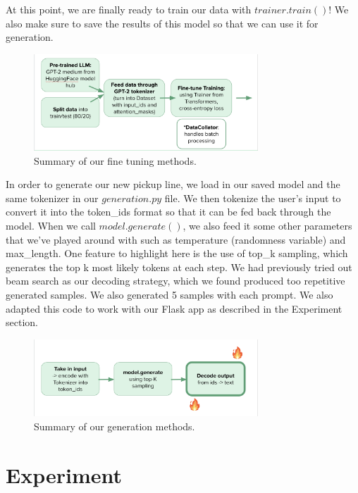 \documentclass[12pt,reqno]{amsart}
\theoremstyle{plain}
\theoremstyle{definition}
\theoremstyle{remark}
\begin{document}
At this point, we are finally ready to train our data with $trainer.train()$! We also make sure to save the results of this model so that we can use it for generation.

\begin{figure}[H]
\centering
\includegraphics[width=0.75\textwidth]{pictures/fine tuning.png}
\caption{Summary of our fine tuning methods.}
\end{figure}

In order to generate our new pickup line, we load in our saved model and the same tokenizer in our $generation.py$ file. We then tokenize the user's input to convert it into the token\_ids format so that it can be fed back through the model. When we call $model.generate()$, we also feed it some other parameters that we've played around with such as temperature (randomness variable) and max\_length. One feature to highlight here is the use of top\_k sampling, which generates the top k most likely tokens at each step. We had previously tried out beam search as our decoding strategy, which we found produced too repetitive generated samples. We also generated 5 samples with each prompt. We also adapted this code to work with our Flask app as described in the Experiment section.

\begin{figure}[H]
\centering
\includegraphics[width=0.75\textwidth]{pictures/generate.png}
\caption{Summary of our generation methods.}
\end{figure}


\section{Experiment}
\end{document}
